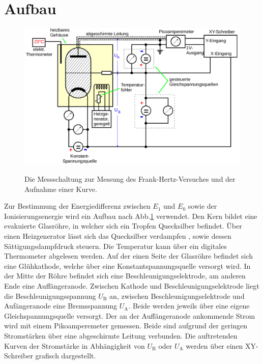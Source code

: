 \section{Aufbau}
\label{sec:Aufbau}

\begin{figure}
 \centering
 \caption{Die Messschaltung zur Messung des Frank-Hertz-Versuches und der Aufnahme einer Kurve.}
 \includegraphics[width=\linewidth-70pt,height=\textheight-70pt,keepaspectratio]{content/Frankpraxis.png}
 \label{fig:frankpraxis}
\end{figure}

Zur Bestimmung der Energiedifferenz zwischen $E_1$ und $E_0$ sowie der Ionisierungsenergie
wird ein Aufbau nach Abb.\ref{fig:frankpraxis} verwendet. Den Kern bildet eine evakuierte Glasröhre,
in welcher sich ein Tropfen Quecksilber befindet. Über einen Heizgenerator lässt
sich das Quecksilber verdampfen , sowie dessen Sättigungsdampfdruck steuern. Die
Temperatur kann über ein digitales Thermometer abgelesen werden. Auf der einen Seite
der Glasröhre befindet sich eine Glühkathode, welche über eine Konstantspannungsquelle
versorgt wird. In der Mitte der Röhre befindet sich eine Beschleunigungselektrode,
am anderen Ende eine Auffängeranode. Zwischen Kathode und Beschleunigungselektrode
liegt die Beschleunigungsspannung $U_\text{B}$ an, zwischen Beschleunigungselektrode
und Aufängeranode eine Bremsspannung $U_\text{A}$. Beide werden jeweils über eine
eigene Gleichspannungsquelle versorgt. Der an der Auffängeranode ankommende Strom
wird mit einem Pikoamperemeter gemessen. Beide sind aufgrund der geringen Stromstärken
über eine abgeschirmte Leitung verbunden. Die auftretenden Kurven der Stromstärke in Abhängigkeit
von $U_\text{B}$ oder $U_\text{A}$ werden über einen XY-Schreiber grafisch dargestellt.
